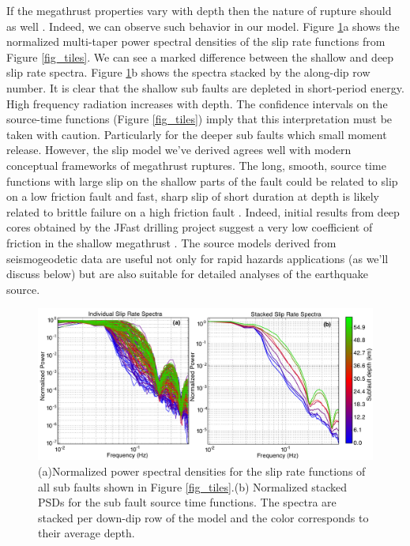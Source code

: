 If the megathrust properties vary with depth then the nature of rupture should as well \citep{lay2012}. Indeed, we can observe such behavior in our model. Figure \ref{fig_stfpsd}a shows the normalized multi-taper power spectral densities of the slip rate functions from Figure \ref{fig_tiles}. We can see a marked difference between the shallow and deep slip rate spectra. Figure \ref{fig_stfpsd}b shows the spectra stacked by the along-dip row number. It is clear that the shallow sub faults are depleted in short-period energy. High frequency radiation increases with depth. The confidence intervals on the source-time functions (Figure \ref{fig_tiles}) imply that this interpretation must be taken with caution. Particularly for the deeper sub faults which small moment release. However, the slip model we've derived agrees well with modern conceptual frameworks of megathrust ruptures. The long, smooth, source time functions with large slip on the shallow parts of the fault could be related to slip on a low friction fault and fast, sharp slip of short duration at depth is likely related to brittle failure on a high friction fault \citep{kanamori2004}. Indeed, initial results from deep cores obtained by the JFast drilling project suggest a very low coefficient of friction in the shallow megathrust \citep{fulton2013}. The source models derived from seismogeodetic data are useful not only for rapid hazards applications (as we'll discuss below) but are also suitable for detailed analyses of the earthquake source.

\begin{figure}[!ht] 
  \centering
  \includegraphics[width=0.99\linewidth]{./figures/ch4/stf_all.pdf}
    \caption[Source time function spectra]{(a)Normalized power spectral densities for the slip rate functions of all sub faults shown in Figure \ref{fig_tiles}.(b) Normalized stacked PSDs for the sub fault source time functions. The spectra are stacked per down-dip row of the model and the color corresponds to their average depth.}
  \label{fig_stfpsd}
\end{figure}

